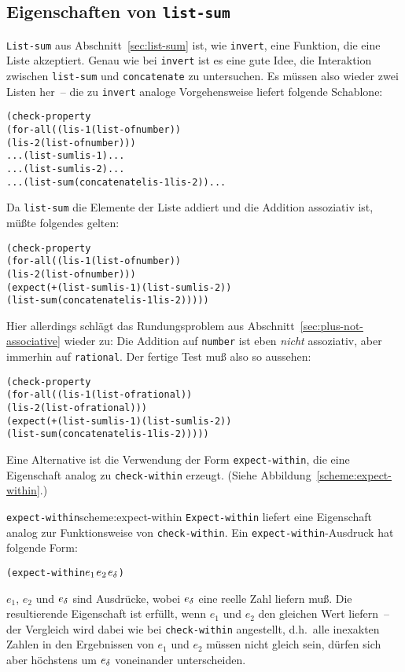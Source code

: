 \subsection{Eigenschaften von \texttt{list-sum}}

\texttt{List-sum} aus
Abschnitt~\ref{sec:list-sum} ist, wie \texttt{invert}, eine Funktion,
die eine Liste akzeptiert.  Genau wie bei \texttt{invert} ist es eine
gute Idee, die Interaktion zwischen \texttt{list-sum} und
\texttt{concatenate} zu untersuchen.  Es müssen also wieder zwei
Listen her~-- die zu \texttt{invert} analoge Vorgehensweise liefert
folgende Schablone:
%
\begin{alltt}
(check-property
 (for-all ((lis-1 (list-of number))
           (lis-2 (list-of number)))
    ... (list-sum lis-1) ...
    ... (list-sum lis-2) ...
    ... (list-sum (concatenate lis-1 lis-2)) ...
\end{alltt}
%
Da \texttt{list-sum} die Elemente der Liste addiert und die Addition
assoziativ ist, müßte folgendes gelten:
%
\begin{alltt}
(check-property
 (for-all ((lis-1 (list-of number))
           (lis-2 (list-of number)))
    (expect (+ (list-sum lis-1) (list-sum lis-2))
            (list-sum (concatenate lis-1 lis-2)))))
\end{alltt}
%
Hier allerdings schlägt das Rundungsproblem aus
Abschnitt~\ref{sec:plus-not-associative} wieder zu: Die Addition auf
\texttt{number} ist eben \emph{nicht} assoziativ, aber immerhin auf
\texttt{rational}.  Der fertige Test muß also so aussehen:
%
\begin{alltt}
(check-property
 (for-all ((lis-1 (list-of rational))
           (lis-2 (list-of rational)))
    (expect (+ (list-sum lis-1) (list-sum lis-2))
            (list-sum (concatenate lis-1 lis-2)))))
\end{alltt}
%
Eine Alternative ist die Verwendung der Form
\texttt{expect-within},
die eine Eigenschaft analog zu \texttt{check-within} erzeugt.  (Siehe
Abbildung~\ref{scheme:expect-within}.)

\begin{feature}{\texttt{expect-within}}{scheme:expect-within}
  \texttt{Expect-within} liefert eine
  Eigenschaft analog zur Funktionsweise von
  \texttt{check-within}.  Ein \texttt{expect-within}-Ausdruck hat folgende
  Form:
\begin{alltt}
(expect-within \(e\sb{1}\)  \(e\sb{2}\) \(e\sb{\delta}\))
\end{alltt}
%
$e_1$, $e_2$ und $e\sb{\delta}$ sind Ausdrücke, wobei $e\sb{\delta}$
eine reelle Zahl liefern muß.  Die resultierende Eigenschaft ist
erfüllt, wenn $e_1$ und $e_2$ den gleichen Wert liefern~-- der
Vergleich wird dabei wie bei \texttt{check-within} angestellt, d.h.\
alle inexakten Zahlen in den Ergebnissen von $e_1$ und $e_2$ müssen
nicht gleich sein, dürfen sich aber höchstens um $e\sb{\delta}$
voneinander unterscheiden.
\end{feature}

